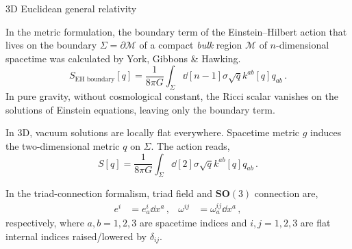 \documentclass[12pt,titlepage]{article}
\begin{document}
\begin{frame}{3D Euclidean general relativity}
    \begin{list}{\,}{\leftmargin=1em \itemindent=0em}
        \item<1-> In the metric formulation, the boundary term of the Einstein–Hilbert action that lives on the boundary $\Sigma=\partial\mathcal{M}$ of a compact \textit{bulk} region $\mathcal{M}$ of $n$-dimensional spacetime was calculated by York, Gibbons \& Hawking.
        \begin{equation}
            S_{\text{EH boundary}}[q]=\frac{1}{8\pi G}\int_\Sigma\dd[n-1]{\sigma}\sqrt{q}k^{ab}[q]q_{ab}\,.
        \end{equation}
        In pure gravity, without cosmological constant, the Ricci scalar vanishes on the solutions of Einstein equations, leaving only the boundary term.
        \item<2-> In 3D, vacuum solutions are locally flat everywhere. Spacetime metric $g$ induces the two-dimensional metric $q$ on $\Sigma$. The action reads,
        \begin{equation}
            S[q]=\frac{1}{8\pi G}\int_\Sigma\dd[2]{\sigma}\sqrt{q} k^{ab}[q] q_{ab}\,.
        \end{equation}
        \item<3-> In the triad-connection formalism, triad field and $\mathbf{SO}(3)$ connection are,
        \begin{align}
            e^i&=e^i_a\dd{x^a}\,, &\omega^{ij}&=\omega^{ij}_a\dd{x^a}\,,
        \end{align}
        respectively, where $a,b=1,2,3$ are spacetime indices and $i,j=1,2,3$ are flat internal indices raised/lowered by $\delta_{ij}$.
    \end{list}
\end{frame}
\end{document}
